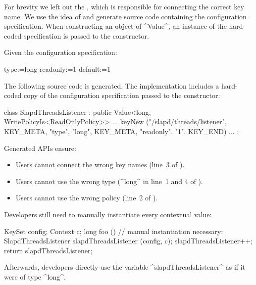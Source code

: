 For brevity we left out the , which is responsible for connecting the correct key name.
We use the idea of  and generate source code containing the configuration specification.
When constructing an object of ^Value^, an instance of the hard-coded specification is passed to the constructor.


\begin{example}
\label{ex:simplified-hierarchy}
Given the configuration specification:

\begin{code}
  type:=long
  readonly:=1
  default:=1
\end{code}

The following source code is generated.
The implementation includes a hard-coded copy of the configuration specification passed to the constructor:

\begin{code}[language=Cpp]
class SlapdThreadsListener : public Value<long,
        WritePolicyIs<ReadOnlyPolicy>> {
	... keyNew ("/slapd/threads/listener",
	            KEY_META, "type", "long",
	            KEY_META, "readonly", "1",
	            KEY_END) ...
};
\end{code}
\end{example}

Generated APIs ensure:
\begin{itemize}
\item Users cannot connect the wrong key names (line~3 of ).
\item Users cannot use the wrong type (^long^ in line~1 and 4 of ).
\item Users cannot use the wrong policy (line~2 of ).
\end{itemize}

\begin{example}
Developers still need to manually instantiate every contextual value:

\begin{code}[language=Cpp]
KeySet config;
Context c;
long foo ()
{
	// manual instantiation necessary:
	SlapdThreadsListener slapdThreadsListener (config, c);
	slapdThreadsListener++;
	return slapdThreadsListener;
}
\end{code}

Afterwards, developers directly use the variable ^slapdThreadsListener^ as if it were of type ^long^.
\end{example}


